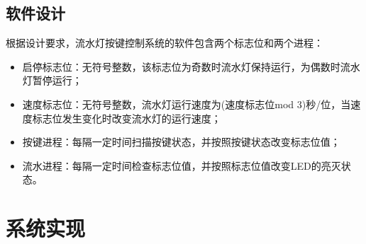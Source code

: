 \documentclass[a4paper]{ctexart}
\begin{document}
\begin{spacing}{1.3}
	\subsection{软件设计}\label{软件设计}
	根据设计要求，流水灯按键控制系统的软件包含两个标志位和两个进程：
	\begin{itemize}
		\item 启停标志位：无符号整数，该标志位为奇数时流水灯保持运行，为偶数时流水灯暂停运行；
		\item 速度标志位：无符号整数，流水灯运行速度为(速度标志位mod 3)秒/位，当速度标志位发生变化时改变流水灯的运行速度；
		\item 按键进程：每隔一定时间扫描按键状态，并按照按键状态改变标志位值；
		\item 流水进程：每隔一定时间检查标志位值，并按照标志位值改变LED的亮灭状态。
	\end{itemize}
	

	\section{系统实现}

\end{spacing}
\end{document}
